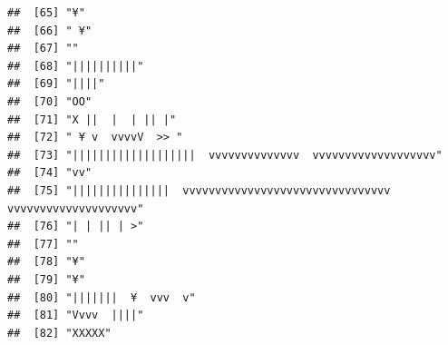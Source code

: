 \documentclass[
]{article}
\begin{document}
\begin{verbatim}
##  [65] "¥"                                                                                                                                        
##  [66] " ¥"                                                                                                                                       
##  [67] ""                                                                                                                                         
##  [68] "||||||||||"                                                                                                                               
##  [69] "||||"                                                                                                                                     
##  [70] "OO"                                                                                                                                       
##  [71] "X ||  |  | || |"                                                                                                                          
##  [72] " ¥ v  vvvvV  >> "                                                                                                                         
##  [73] "|||||||||||||||||||  vvvvvvvvvvvvvv  vvvvvvvvvvvvvvvvvvv"                                                                                 
##  [74] "vv"                                                                                                                                       
##  [75] "|||||||||||||||  vvvvvvvvvvvvvvvvvvvvvvvvvvvvvvvv  vvvvvvvvvvvvvvvvvvvv"                                                                  
##  [76] "| | || | >"                                                                                                                               
##  [77] ""                                                                                                                                         
##  [78] "¥"                                                                                                                                        
##  [79] "¥"                                                                                                                                        
##  [80] "|||||||  ¥  vvv  v"                                                                                                                       
##  [81] "Vvvv  ||||"                                                                                                                               
##  [82] "XXXXX"                                                                                                                                    

\end{verbatim}
\end{document}
